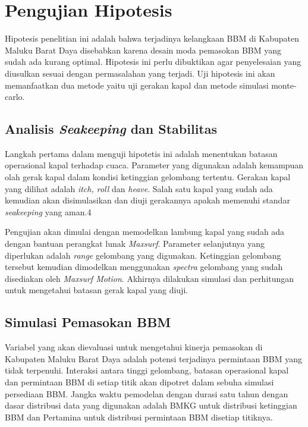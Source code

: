 \section{Pengujian Hipotesis}
\label{sec:uji-hipotesis}

Hipotesis penelitian ini adalah bahwa terjadinya kelangkaan BBM di Kabupaten Maluku Barat Daya disebabkan karena desain moda pemasokan BBM yang sudah ada kurang optimal. Hipotesis ini perlu dibuktikan agar penyelesaian yang diusulkan sesuai dengan permasalahan yang terjadi. Uji hipotesis ini akan memanfaatkan dua metode yaitu uji gerakan kapal dan metode simulasi monte-carlo.

\subsection{Analisis \emph{Seakeeping} dan Stabilitas}
\label{subsec:analisis-seakeeping}

Langkah pertama dalam menguji hipotetis ini adalah menentukan batasan operasional kapal terhadap cuaca. Parameter yang digunakan adalah kemampuan olah gerak kapal dalam kondisi ketinggian gelombang tertentu. Gerakan kapal yang dilihat adalah \textit{itch, roll} dan \emph{heave}. Salah satu kapal yang sudah ada kemudian akan disimulasikan dan diuji gerakannya apakah memenuhi standar \emph{seakeeping} yang aman.4

Pengujian akan dimulai dengan memodelkan lambung kapal yang sudah ada dengan bantuan perangkat lunak \emph{Maxsurf}. Parameter selanjutnya yang diperlukan adalah \emph{range} gelombang yang digunakan. Ketinggian gelombang tersebut kemudian dimodelkan menggunakan \emph{spectra} gelombang yang sudah disediakan oleh \emph{Maxsurf Motion}. Akhirnya dilakukan simulasi dan perhitungan untuk mengetahui batasan gerak kapal yang diuji.

\subsection{Simulasi Pemasokan BBM}
\label{subsec:metode-simul-bbm}

Variabel yang akan dievaluasi untuk mengetahui kinerja pemasokan di Kabupaten Maluku Barat Daya adalah potensi terjadinya permintaan BBM yang tidak terpenuhi. Interaksi antara tinggi gelombang, batasan operasional kapal dan permintaan BBM di setiap titik akan dipotret dalam sebuha simulasi persediaan BBM. Jangka waktu pemodelan dengan durasi satu tahun dengan dasar distribusi data yang digunakan adalah BMKG untuk distribusi ketinggian BBM dan Pertamina untuk distribusi permintaan BBM disetiap titiknya.

